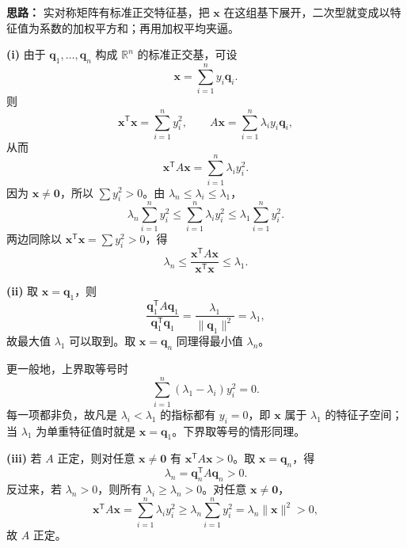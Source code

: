 \ifshowsolutions%
\textbf{思路：} 实对称矩阵有标准正交特征基，把 \(\boldsymbol{x}\) 在这组基下展开，二次型就变成以特征值为系数的加权平方和；再用加权平均夹逼。

\textbf{(i)} 由于 \(\boldsymbol{q}_1,\dots,\boldsymbol{q}_n\) 构成 \(\mathbb R^n\) 的标准正交基，可设
\[
\boldsymbol{x}=\sum_{i=1}^n y_i\boldsymbol{q}_i.
\]
则
\[
\boldsymbol{x}^{\mathsf T}\boldsymbol{x}=\sum_{i=1}^n y_i^2,\qquad
A\boldsymbol{x}=\sum_{i=1}^n \lambda_i y_i\boldsymbol{q}_i,
\]
从而
\[
\boldsymbol{x}^{\mathsf T}A\boldsymbol{x}
=\sum_{i=1}^n \lambda_i y_i^2.
\]
因为 \(\boldsymbol{x}\ne\boldsymbol{0}\)，所以 \(\sum y_i^2>0\)。由 \(\lambda_n\le\lambda_i\le\lambda_1\)，
\[
\lambda_n\sum_{i=1}^n y_i^2
\le\sum_{i=1}^n\lambda_i y_i^2
\le\lambda_1\sum_{i=1}^n y_i^2.
\]
两边同除以 \(\boldsymbol{x}^{\mathsf T}\boldsymbol{x}=\sum y_i^2>0\)，得
\[
\lambda_n\le\frac{\boldsymbol{x}^{\mathsf T}A\boldsymbol{x}}{\boldsymbol{x}^{\mathsf T}\boldsymbol{x}}\le\lambda_1.
\]

\textbf{(ii)} 取 \(\boldsymbol{x}=\boldsymbol{q}_1\)，则
\[
\frac{\boldsymbol{q}_1^{\mathsf T}A\boldsymbol{q}_1}{\boldsymbol{q}_1^{\mathsf T}\boldsymbol{q}_1}
=\frac{\lambda_1}{\|\boldsymbol{q}_1\|^2}=\lambda_1,
\]
故最大值 \(\lambda_1\) 可以取到。取 \(\boldsymbol{x}=\boldsymbol{q}_n\) 同理得最小值 \(\lambda_n\)。

更一般地，上界取等号时
\[
\sum_{i=1}^n(\lambda_1-\lambda_i)y_i^2=0.
\]
每一项都非负，故凡是 \(\lambda_i<\lambda_1\) 的指标都有 \(y_i=0\)，即 \(\boldsymbol{x}\) 属于 \(\lambda_1\) 的特征子空间；当 \(\lambda_1\) 为单重特征值时就是 \(\boldsymbol{x}=\boldsymbol{q}_1\)。下界取等号的情形同理。

\textbf{(iii)} 若 \(A\) 正定，则对任意 \(\boldsymbol{x}\ne\boldsymbol{0}\) 有 \(\boldsymbol{x}^{\mathsf T}A\boldsymbol{x}>0\)。取 \(\boldsymbol{x}=\boldsymbol{q}_n\)，得
\[
\lambda_n=\boldsymbol{q}_n^{\mathsf T}A\boldsymbol{q}_n>0.
\]
反过来，若 \(\lambda_n>0\)，则所有 \(\lambda_i\ge\lambda_n>0\)。对任意 \(\boldsymbol{x}\ne\boldsymbol{0}\)，
\[
\boldsymbol{x}^{\mathsf T}A\boldsymbol{x}
=\sum_{i=1}^n\lambda_i y_i^2
\ge\lambda_n\sum_{i=1}^n y_i^2
=\lambda_n\|\boldsymbol{x}\|^2>0,
\]
故 \(A\) 正定。
\else \answerarea[10] \fi%
